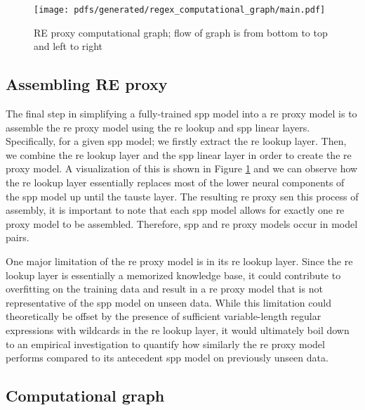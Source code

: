 \begin{figure}[t!]
  \centering
  \texttt{[image: pdfs/generated/regex\_computational\_graph/main.pdf]}
  \caption{RE proxy computational graph; flow of graph is
    from bottom to top and left to right}
  \label{fig:regex_cg}
\end{figure}

\subsection{Assembling RE proxy}

The final step in simplifying a fully-trained \ac{spp} model into a \ac{re}
proxy model is to assemble the \ac{re} proxy model using the \ac{re} lookup and
\ac{spp} linear layers. Specifically, for a given \ac{spp} model; we firstly
extract the \ac{re} lookup layer. Then, we combine the \ac{re} lookup layer and
the \ac{spp} linear layer in order to create the \ac{re} proxy model. A
visualization of this is shown in Figure \ref{fig:regex_cg} and we can observe
how the \ac{re} lookup layer essentially replaces most of the lower neural
components of the \ac{spp} model up until the \ac{tauste} layer. The resulting
\ac{re} proxy sen this process of assembly, it is important to note that each \ac{spp} model
allows for exactly one \ac{re} proxy model to be assembled. Therefore, \ac{spp}
and \ac{re} proxy models occur in model pairs.

One major limitation of the \ac{re} proxy model is in its \ac{re} lookup layer.
Since the \ac{re} lookup layer is essentially a memorized knowledge base, it
could contribute to overfitting on the training data and result in a \ac{re}
proxy model that is not representative of the \ac{spp} model on unseen data.
While this limitation could theoretically be offset by the presence of
sufficient variable-length regular expressions with wildcards in the \ac{re}
lookup layer, it would ultimately boil down to an empirical investigation to
quantify how similarly the \ac{re} proxy model performs compared to its
antecedent \ac{spp} model on previously unseen data.

\subsection{Computational graph}

\label{section:re_cg}

